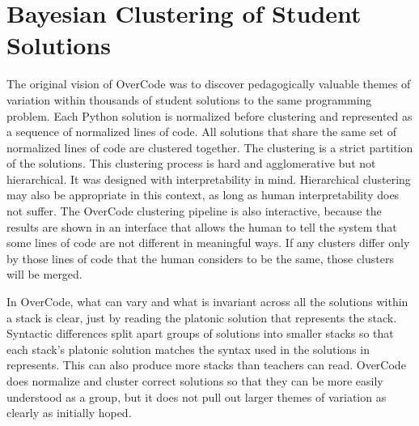 \chapter{Bayesian Clustering of Student Solutions}\label{chapter:grovercode}

The original vision of OverCode was to discover pedagogically valuable themes of variation within thousands of student solutions to the same programming problem. Each Python solution is normalized before clustering and represented as a sequence of normalized lines of code. All solutions that share the same set of normalized lines of code are clustered together. The clustering is a strict partition of the solutions. This clustering process is hard and agglomerative but not hierarchical. It was designed with interpretability in mind. Hierarchical clustering may also be appropriate in this context, as long as human interpretability does not suffer. The OverCode clustering pipeline is also interactive, because the results are shown in an interface that allows the human to tell the system that some lines of code are not different in meaningful ways. If any clusters differ only by those lines of code that the human considers to be the same, those clusters will be merged. 

In OverCode, what can vary and what is invariant across all the solutions within a stack is clear, just by reading the platonic solution that represents the stack. Syntactic differences split apart groups of solutions into smaller stacks so that each stack's platonic solution matches the syntax used in the solutions in represents. This can also produce more stacks than teachers can read. OverCode does normalize and cluster correct solutions so that they can be more easily understood as a group, but it does not pull out larger themes of variation as clearly as initially hoped.






